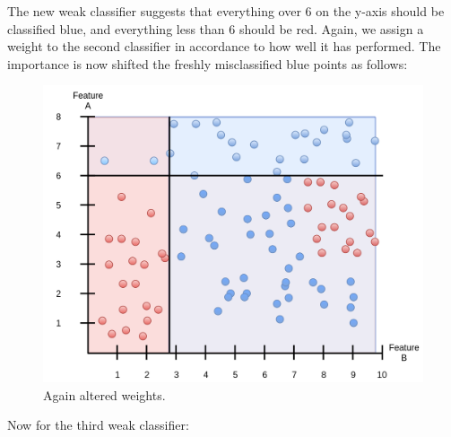 \documentclass[a4paper, 12pt]{article}
\begin{document}
                    \newpage
                    
                    \par The new weak classifier suggests that everything over 6 on the y-axis should be classified blue, and everything less than 6 should be red. Again, we assign a weight to the second classifier in accordance to how well it has performed. The importance is now shifted the freshly misclassified blue points as follows:
                    
                    \begin{figure}[h]
                            \caption{Again altered weights.}
                            \centering
                            \includegraphics[width=\textwidth]{boosting4}
                    \end{figure} 
                    
                    \newpage
                    
                    \par Now for the third weak classifier:
                    
\end{document}
